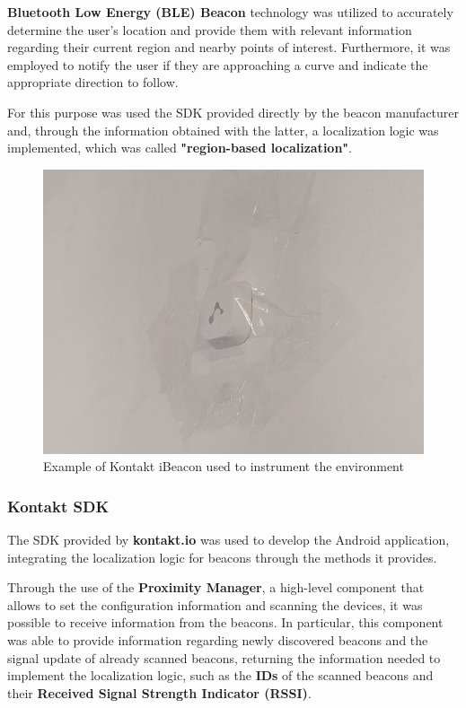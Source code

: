 \textbf{Bluetooth Low Energy (BLE) Beacon} technology was utilized to accurately determine the user's location and provide them with relevant information regarding their current region and nearby points of interest. Furthermore, it was employed to notify the user if they are approaching a curve and indicate the appropriate direction to follow.

For this purpose was used the SDK provided directly by the beacon manufacturer and, through the information obtained with the latter, a localization logic was implemented, which was called \textbf{"region-based localization"}.

\begin{figure}[H]
    \centering
    \includegraphics[scale=0.4]{chapters/architecture/images/beacon.jpg}
    \caption{Example of Kontakt iBeacon used to instrument the environment}
\end{figure}


\subsubsection{Kontakt SDK}
The SDK provided by \textbf{kontakt.io} was used to develop the Android application, integrating the localization logic for beacons through the methods it provides. \cite{kontakt:sdk}

Through the use of the \textbf{Proximity Manager}, a high-level component that allows to set the configuration information and scanning the devices, it was possible to receive information from the beacons. 
In particular, this component was able to provide information regarding newly discovered beacons and the signal update of already scanned beacons, returning the information needed to implement the localization logic, such as the \textbf{IDs} of the scanned beacons and their \textbf{Received Signal Strength Indicator (RSSI)}.


